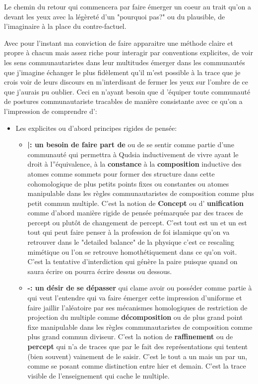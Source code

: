 \documentclass{article}
\begin{document}
Le chemin du retour qui commencera par faire émerger un coeur au trait qu'on a devant les yeux  avec la légèreté d'un "pourquoi pas?" ou du plausible, de l'imaginaire à la place du contre-factuel. 

Avec pour l'instant ma conviction de  faire apparaitre  une méthode claire et propre à chacun mais assez riche pour interagir par conventions explicites, de voir les sens communautaristes dans leur multitudes émerger dans les communautés que j'imagine échanger le plus fidèlement qu'il m'est possible à la trace que je crois voir de leurs discours en m'interdisant de fermer les yeux sur l'ombre de ce que j'aurais pu oublier.  
Ceci en n'ayant besoin que  d 'équiper toute communauté de postures communautariste tracables de manière consistante avec 
ce qu'on a l'impression de comprendre d':
\begin{itemize}
\item Les explicites ou d'abord principes  rigides de pensée:
\begin{itemize}
\item \textbf{  |: un besoin de faire part de} ou de se sentir comme partie d'une communauté qui permettra à Qudsia inductivement de vivre ayant le droit à l''équivalence, à la \textbf{constance} à la \textbf{composition} inductive des atomes comme sommets pour former des structure dans cette cohomologique de  plus petits points fixes ou constantes ou atomes manipulable dans les règles communautaristes de composition comme plus petit commun multiple. C'est la notion de \textbf{ Concept} ou d' \textbf{unification} comme d'abord manière rigide de pensée prémarquée par des traces de percept ou plutôt de changement de percept. C'est tout est un et un est tout qui peut faire penser à la profession de foi islamique qu'on va retrouver dans le "detailed balance" de la physique c'est ce rescaling mimétique ou l'on se retrouve homothétiquement dans ce qu'on voit.  C'est la tentative d'interdiction qui génère la paire puisque quand on saura écrire on pourra écrire dessus ou dessous.
  \item \textbf{-: un désir de se dépasser} qui clame avoir ou posséder comme partie à qui veut l'entendre qui va faire émerger cette impression d'uniforme 
  et faire jaillir l'aléatoire par ses mécanismes homologiques de restriction de projection du multiple comme \textbf{  décomposition} ou de plus grand point fixe manipulable   dans les règles communautaristes de composition comme plus grand commun diviseur. C'est la notion de \textbf{raffinement} ou de  \textbf{percept} qui n'a de traces que par le fait des représentations qui tentent (bien souvent) vainement de le saisir. C'est le tout a un mais un par un, comme se posant comme distinction entre hier et demain. C'est la trace visible de l'enseignement qui cache le multiple.

\end{itemize}
\end{itemize}
\end{document}
